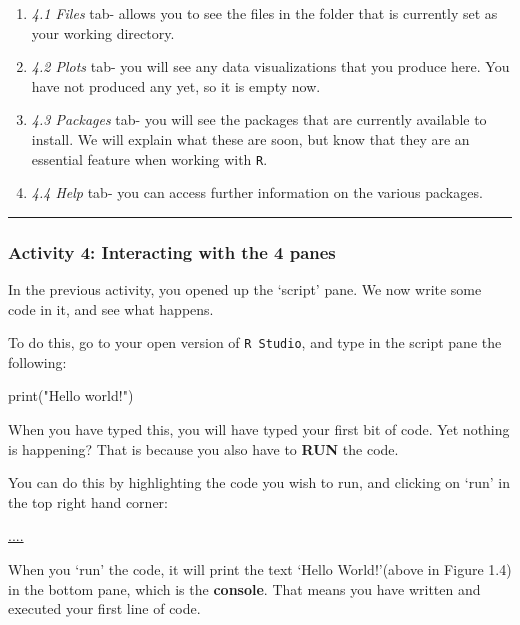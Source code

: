 \documentclass[
]{book}
\newenvironment{Shaded}{\begin{snugshade}}{\end{snugshade}}
\newcommand{\FunctionTok}[1]{\textcolor[rgb]{0.00,0.00,0.00}{#1}}
\newcommand{\NormalTok}[1]{#1}
\newcommand{\StringTok}[1]{\textcolor[rgb]{0.31,0.60,0.02}{#1}}
\begin{document}
\begin{enumerate}
\def\labelenumi{\roman{enumi})}
\item
  \emph{4.1 Files} tab- allows you to see the files in the folder that is currently set as your working directory.
\item
  \emph{4.2 Plots} tab- you will see any data visualizations that you produce here. You have not produced any yet, so it is empty now.
\item
  \emph{4.3 Packages} tab- you will see the packages that are currently available to install. We will explain what these are soon, but know that they are an essential feature when working with \texttt{R}.
\item
  \emph{4.4 Help} tab- you can access further information on the various packages.
\end{enumerate}

\begin{center}\rule{0.5\linewidth}{0.5pt}\end{center}

\hypertarget{activity-4-interacting-with-the-4-panes}{%
\subsubsection{Activity 4: Interacting with the 4 panes}\label{activity-4-interacting-with-the-4-panes}}

In the previous activity, you opened up the `script' pane. We now write some code in it, and see what happens.

To do this, go to your open version of \texttt{R\ Studio}, and type in the script pane the following:

\begin{Shaded}
\begin{Highlighting}[]
\FunctionTok{print}\NormalTok{(}\StringTok{"Hello world!"}\NormalTok{)}
\end{Highlighting}
\end{Shaded}

When you have typed this, you will have typed your first bit of code. Yet nothing is happening? That is because you also have to \textbf{RUN} the code.

You can do this by highlighting the code you wish to run, and clicking on `run' in the top right hand corner:

\url{....}

When you `run' the code, it will print the text `Hello World!'(above in Figure 1.4) in the bottom pane, which is the \textbf{console}. That means you have written and executed your first line of code.
\end{document}
